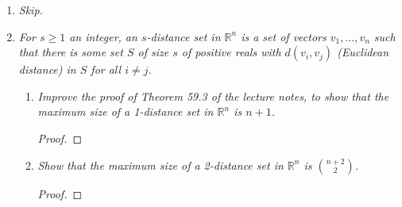 \documentclass{article}
\begin{document}
\begin{enumerate}
\begin{enumerate}
\begin{proof}
          Using the above claim, we iteratively construct a set $C$ in
          $\mathcal{A}$ that is contained in $B_{k+1}$, a contradiction:
          Write $B_{k+1}=\{b_1,\ldots,b_{m+1}\}$. Let $C_0$ be an arbitrary
          set in $\mathcal{A}$. The idea of the construction is to
          gradually replace each element in $C_0$ with elements in
          $B_{k+1}$, using the above claim, until we get
          $C=C_m=\{b_1,\ldots,b_m\}$. At each stage $s<m$, $C_s$ will be
          contained in $\mathcal{A}$, and contain the elements
          $\{b_1,\ldots,b_s\}$. At stage $s+1$, write
          \[C_s=\{b_1,\ldots,b_s,a_{s+1},\ldots,a_m\} \in\mathcal{A}.\]
          If $b_{s+1}$ lies in $C_s$, set $C_{s+1}=C_s$ and go to the next
          stage. Otherwise $C_s\cup\{b_{s+1}\}$ lies in $\mathcal{B}$ by
          the above claim since $C_s$ lies in $\mathcal{A}$. Let
          $D_s\in\mathcal{B}$ be a set in $\mathcal{B}$ that contains
          $C_s\cup\{b_{s+1}\}$, and write
          \[D_s=\{b_1,\ldots,b_{s+1},d_{s+2},\ldots,d_{m+1}\}
          \in\mathcal{B}.\]
          Then let $C_{s+1}=\{b_1,\ldots,b_{s+1},d_{s+2},\ldots,d_{m}\}$;
          this will be contained in $\mathcal{A}$ from the above claim and
          contain $\{b_1,\ldots,b_{s+1}\}$ as required.
          
        \end{proof}
    \end{enumerate}

  \item \it Skip.

  \item \it For $s\geq1$ an integer, an $s$-distance set in $\mathbb{R}^n$
    is a set of vectors $v_1,\ldots,v_n$ such that there is some set $S$ of
    size $s$ of positive reals with $d(v_i,v_j)$ (Euclidean distance) in
    $S$ for all $i\neq j$.

    \begin{enumerate}
      \item \it Improve the proof of Theorem 59.3 of the lecture notes, to
        show that the maximum size of a 1-distance set in $\mathbb{R}^n$ is
        $n+1$.

        \begin{proof}
        \end{proof}

      \item \it Show that the maximum size of a 2-distance set in
        $\mathbb{R}^n$ is $\binom{n+2}{2}$.

        \begin{proof}
        \end{proof}
    \end{enumerate}
\end{enumerate}
\end{document}
